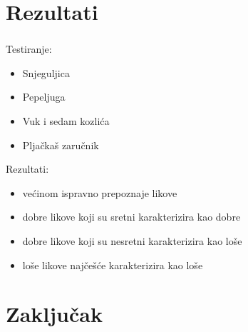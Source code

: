 \documentclass[t, xcolor={usenames,dvipsnames,svgnames,table}]{beamer}
\begin{document}
\section{Rezultati}
	
	\emph{}
	\begin{frame}
		\sectionpage
	\end{frame}
	
	\begin{frame}
		\frametitle{\secname}
		
		Testiranje:
		\begin{itemize}
			\item	Snjeguljica
			\item 	Pepeljuga
			\item 	Vuk i sedam kozlića
			\item	Pljačkaš zaručnik
		\end{itemize}
		
		\bigskip
		
		Rezultati:
		\begin{itemize}
			\item 	većinom ispravno prepoznaje likove
			\item	dobre likove koji su sretni karakterizira kao dobre
			\item 	dobre likove koji su nesretni karakterizira kao loše
			\item 	loše likove najčešće karakterizira kao loše
		\end{itemize}
		
	\end{frame}

\section{Zaključak}
	
	\begin{frame}
		\sectionpage
	\end{frame}
	
\end{document}
